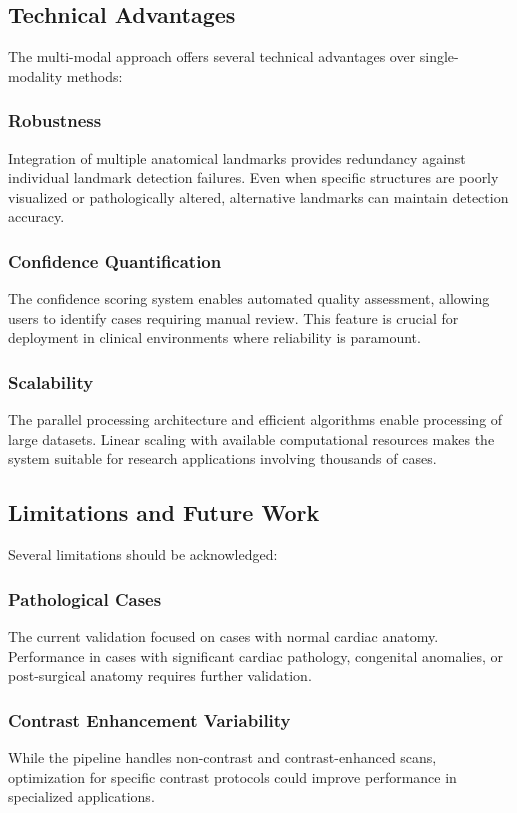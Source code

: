 \documentclass[11pt,a4paper]{article}
\begin{document}
\subsection{Technical Advantages}

The multi-modal approach offers several technical advantages over single-modality methods:

\subsubsection{Robustness}
Integration of multiple anatomical landmarks provides redundancy against individual landmark detection failures. Even when specific structures are poorly visualized or pathologically altered, alternative landmarks can maintain detection accuracy.

\subsubsection{Confidence Quantification}
The confidence scoring system enables automated quality assessment, allowing users to identify cases requiring manual review. This feature is crucial for deployment in clinical environments where reliability is paramount.

\subsubsection{Scalability}
The parallel processing architecture and efficient algorithms enable processing of large datasets. Linear scaling with available computational resources makes the system suitable for research applications involving thousands of cases.

\subsection{Limitations and Future Work}

Several limitations should be acknowledged:

\subsubsection{Pathological Cases}
The current validation focused on cases with normal cardiac anatomy. Performance in cases with significant cardiac pathology, congenital anomalies, or post-surgical anatomy requires further validation.

\subsubsection{Contrast Enhancement Variability}
While the pipeline handles non-contrast and contrast-enhanced scans, optimization for specific contrast protocols could improve performance in specialized applications.
\end{document}
